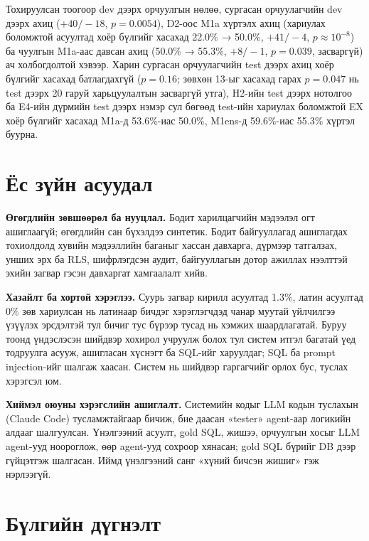 Тохируулсан тоогоор dev дээрх орчуулгын нөлөө, сургасан орчуулагчийн dev дээрх ахиц ($+40/-18$, $p = 0.0054$), D2-оос
M1a хүртэлх ахиц (хариулах боломжтой асуултад хоёр бүлгийг хасахад 22.0\% → 50.0\%, $+41/-4$, $p \approx 10^{-8}$) ба
чуулгын M1a-аас давсан ахиц (50.0\% → 55.3\%, $+8/-1$, $p = 0.039$, засваргүй) ач холбогдолтой хэвээр. Харин сургасан
орчуулагчийн test дээрх ахиц хоёр бүлгийг хасахад батлагдахгүй ($p = 0.16$; зөвхөн 13-ыг хасахад гарах $p = 0.047$ нь test
дээрх 20 гаруй харьцуулалтын засваргүй утга), H2-ийн test дээрх нотолгоо ба E4-ийн дүрмийн test дээрх нэмэр сул бөгөөд
test-ийн хариулах боломжтой EX хоёр бүлгийг хасахад M1a-д 53.6\%-иас 50.0\%, M1ens-д 59.6\%-иас 55.3\% хүртэл буурна.

\section{Ёс зүйн асуудал}
\label{sec:ethics}

\textbf{Өгөгдлийн зөвшөөрөл ба нууцлал.} Бодит харилцагчийн мэдээлэл огт ашиглаагүй; өгөгдлийн сан бүхэлдээ синтетик.
Бодит байгууллагад ашиглагдах тохиолдолд хувийн мэдээллийн баганыг хассан давхарга, дүрмээр татгалзах, унших эрх ба RLS,
шифрлэгдсэн аудит, байгууллагын дотор ажиллах нээлттэй эхийн загвар гэсэн давхаргат хамгаалалт хийв.

\textbf{Хазайлт ба хортой хэрэглээ.} Суурь загвар кирилл асуултад 1.3\%, латин асуултад 0\% зөв хариулсан нь латинаар
бичдэг хэрэглэгчдэд чанар муутай үйлчилгээ үзүүлэх эрсдэлтэй тул бичиг тус бүрээр тусад нь хэмжих шаардлагатай. Буруу
тоонд үндэслэсэн шийдвэр хохирол учруулж болох тул систем итгэл багатай үед тодруулга асууж, ашигласан хүснэгт ба SQL-ийг
харуулдаг; SQL ба prompt injection-ийг шалгаж хаасан. Систем нь шийдвэр гаргагчийг орлох бус, туслах хэрэгсэл юм.

\textbf{Хиймэл оюуны хэрэгслийн ашиглалт.}\label{sec:ai-tools} Системийн кодыг LLM кодын туслахын (Claude Code) тусламжтайгаар
бичиж, бие даасан «tester» agent-аар логикийн алдааг шалгуулсан. Үнэлгээний асуулт, gold SQL, жишээ, орчуулгын хосыг LLM
agent-ууд ноороглож, өөр agent-ууд сохроор хянасан; gold SQL бүрийг DB дээр гүйцэтгэж шалгасан. Иймд үнэлгээний санг
«хүний бичсэн жишиг» гэж нэрлээгүй.

\section{Бүлгийн дүгнэлт}
\label{sec:ch7-summary}


